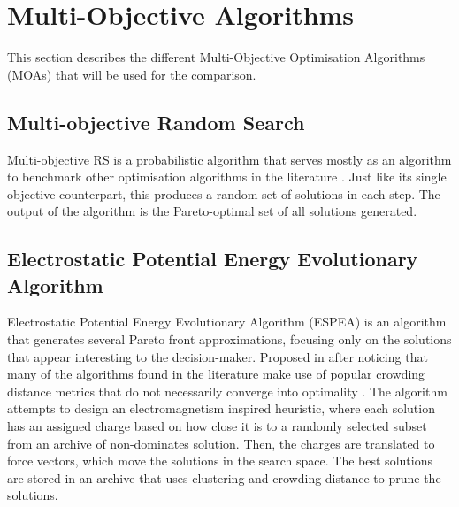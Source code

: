 \section{Multi-Objective Algorithms}

This section describes the different Multi-Objective Optimisation Algorithms (MOAs) that will be used for the comparison.


\subsection{Multi-objective Random Search}

Multi-objective RS is a probabilistic algorithm that serves mostly as an algorithm to benchmark other optimisation algorithms in the literature \cite{zitzler1998multiobjective}. Just like its single objective counterpart, this produces a random set of solutions in each step. The output of the algorithm is the Pareto-optimal set of all solutions generated.

\subsection{Electrostatic Potential Energy Evolutionary Algorithm}

Electrostatic Potential Energy Evolutionary Algorithm (ESPEA) \cite{teich2001pareto} is an algorithm that generates several Pareto front approximations, focusing only on the solutions that appear interesting to the decision-maker. Proposed in \cite{teich2001pareto} after noticing that many of the algorithms found in the literature make use of popular crowding distance metrics that do not necessarily converge into optimality \cite{deb2002fast}. %
%
The algorithm attempts to design an electromagnetism inspired heuristic, where each solution has an assigned charge based on how close it is to a randomly selected subset from an archive of non-dominates solution. Then, the charges are translated to force vectors, which move the solutions in the search space. The best solutions are stored in an archive that uses clustering and crowding distance to prune the solutions.\\

